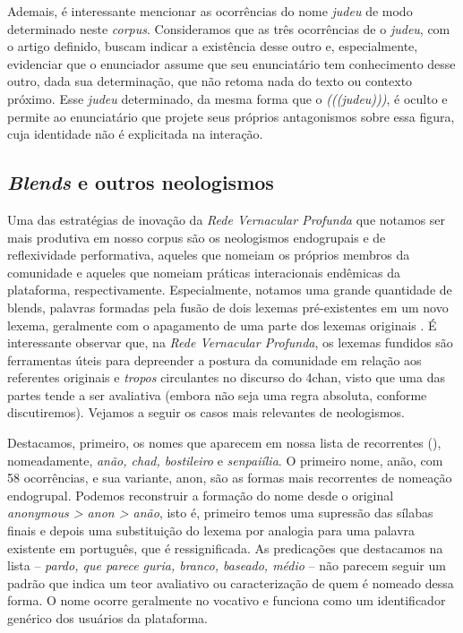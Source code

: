 \documentclass[portuguese]{textolivre}
\begin{document}
Ademais, é interessante mencionar as ocorrências do nome \emph{judeu} de modo determinado neste \emph{corpus}. Consideramos que as três ocorrências de o \emph{judeu}, com o artigo definido, buscam indicar a existência desse outro e, especialmente, evidenciar que o enunciador assume que seu enunciatário tem conhecimento desse outro, dada sua determinação, que não retoma nada do texto ou contexto próximo. Esse \emph{judeu} determinado, da mesma forma que o \emph{(((judeu)))}, é oculto e permite ao enunciatário que projete seus próprios antagonismos sobre essa figura, cuja identidade não é explicitada na interação.


\subsection{\emph{Blends} e outros neologismos}

Uma das estratégias de inovação da \emph{Rede Vernacular Profunda} \cite{peeters2021vernacular, tuters2021meme} que notamos ser mais produtiva em nosso corpus são os neologismos endogrupais e de reflexividade performativa, aqueles que nomeiam os próprios membros da comunidade e aqueles que nomeiam práticas interacionais endêmicas da plataforma, respectivamente. Especialmente, notamos uma grande quantidade de blends, palavras formadas pela fusão de dois lexemas pré-existentes em um novo lexema, geralmente com o apagamento de uma parte dos lexemas originais \cite{fradin2015}. É interessante observar que, na \emph{Rede Vernacular Profunda}, os lexemas fundidos são ferramentas úteis para depreender a postura da comunidade em relação aos referentes originais e \emph{tropos} circulantes no discurso do 4chan, visto que uma das partes tende a ser avaliativa (embora não seja uma regra absoluta, conforme discutiremos). Vejamos a seguir os casos mais relevantes de neologismos.

Destacamos, primeiro, os nomes que aparecem em nossa lista de recorrentes (), nomeadamente, \emph{anão, chad, bostileiro} e \emph{senpaiília}. O primeiro nome, anão, com 58 ocorrências, e sua variante, anon, são as formas mais recorrentes de nomeação endogrupal. Podemos reconstruir a formação do nome desde o original \emph{anonymous > anon > anão}, isto é, primeiro temos uma supressão das sílabas finais e depois uma substituição do lexema por analogia para uma palavra existente em português, que é ressignificada. As predicações que destacamos na lista – \emph{pardo, que parece guria, branco, baseado, médio} – não parecem seguir um padrão que indica um teor avaliativo ou caracterização de quem é nomeado dessa forma. O nome ocorre geralmente no vocativo e funciona como um identificador genérico dos usuários da plataforma. 
\end{document}
